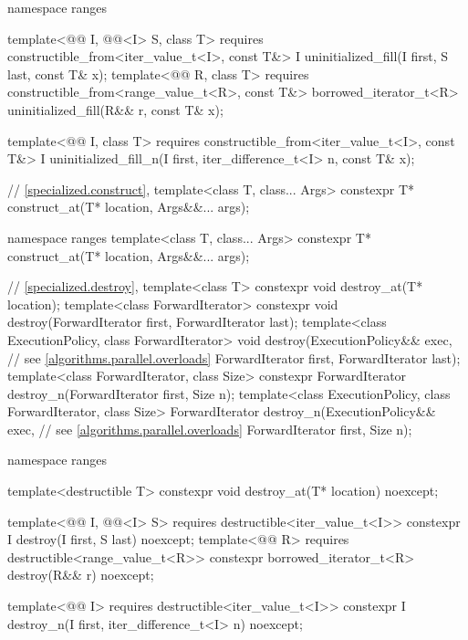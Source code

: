 \begin{codeblock}
{  namespace ranges {
    template<@@ I, @@<I> S, class T>
      requires constructible_from<iter_value_t<I>, const T&>
        I uninitialized_fill(I first, S last, const T& x);
    template<@@ R, class T>
      requires constructible_from<range_value_t<R>, const T&>
        borrowed_iterator_t<R> uninitialized_fill(R&& r, const T& x);

    template<@@ I, class T>
      requires constructible_from<iter_value_t<I>, const T&>
        I uninitialized_fill_n(I first, iter_difference_t<I> n, const T& x);
  }

  // \ref{specialized.construct}, 
  template<class T, class... Args>
    constexpr T* construct_at(T* location, Args&&... args);

  namespace ranges {
    template<class T, class... Args>
      constexpr T* construct_at(T* location, Args&&... args);
  }

  // \ref{specialized.destroy}, 
  template<class T>
    constexpr void destroy_at(T* location);
  template<class ForwardIterator>
    constexpr void destroy(ForwardIterator first, ForwardIterator last);
  template<class ExecutionPolicy, class ForwardIterator>
    void destroy(ExecutionPolicy&& exec,                        // see \ref{algorithms.parallel.overloads}
                 ForwardIterator first, ForwardIterator last);
  template<class ForwardIterator, class Size>
    constexpr ForwardIterator destroy_n(ForwardIterator first, Size n);
  template<class ExecutionPolicy, class ForwardIterator, class Size>
    ForwardIterator destroy_n(ExecutionPolicy&& exec,           // see \ref{algorithms.parallel.overloads}
                              ForwardIterator first, Size n);

  namespace ranges {
    template<destructible T>
      constexpr void destroy_at(T* location) noexcept;

    template<@@ I, @@<I> S>
      requires destructible<iter_value_t<I>>
        constexpr I destroy(I first, S last) noexcept;
    template<@@ R>
      requires destructible<range_value_t<R>>
        constexpr borrowed_iterator_t<R> destroy(R&& r) noexcept;

    template<@@ I>
      requires destructible<iter_value_t<I>>
        constexpr I destroy_n(I first, iter_difference_t<I> n) noexcept;
  }

}
\end{codeblock}
